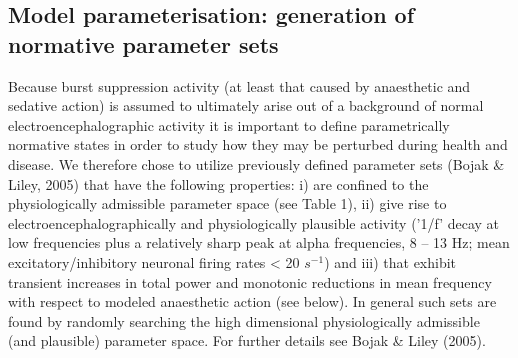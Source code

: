 \documentclass[a4paper,12pt]{article}
\begin{document}
\subsection{Model parameterisation: generation of normative parameter sets}
Because burst suppression activity (at least that caused by
anaesthetic and sedative action) is assumed to ultimately arise out of
a background of normal electroencephalographic activity it is
important to define parametrically normative states in order to study
how they may be perturbed during health and disease. We therefore
chose to utilize previously defined parameter sets (Bojak \& Liley,
2005) that have the following properties: i) are confined to the
physiologically admissible parameter space (see Table 1), ii) give rise
to electroencephalographically and physiologically plausible activity
('1/f' decay at low frequencies plus a relatively sharp peak at alpha
frequencies, 8 – 13 Hz; mean excitatory/inhibitory neuronal firing rates
< 20 $s^{-1}$) and iii) that exhibit transient increases in total power and
monotonic reductions in mean frequency with respect to modeled
anaesthetic action (see below). In general such sets are found by
randomly searching the high dimensional physiologically admissible
(and plausible) parameter space. For further details see Bojak \& Liley
(2005).
\end{document}
